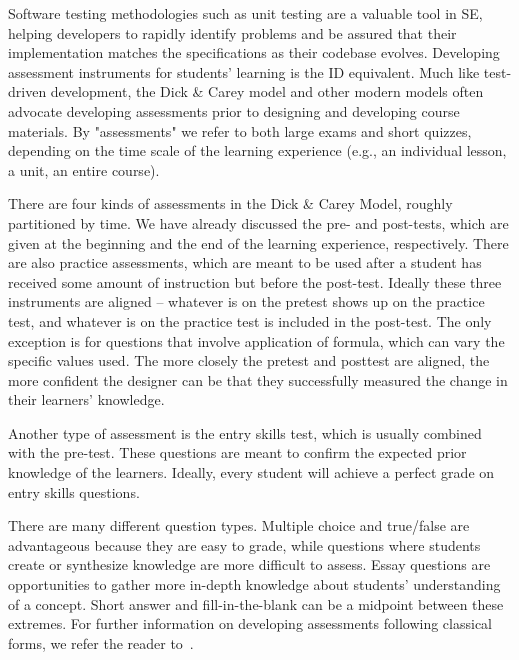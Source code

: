 
Software testing methodologies such as unit testing are a valuable tool in SE, helping developers to rapidly identify problems and be assured that their implementation matches the specifications as their codebase evolves.
Developing assessment instruments for students' learning is the ID equivalent.
Much like test-driven development, the Dick \& Carey model and other modern models often advocate developing assessments prior to designing and developing course materials.
By "assessments" we refer to both large exams and short quizzes, depending on the time scale of the learning experience (e.g., an individual lesson, a unit, an entire course).

There are four kinds of assessments in the Dick \& Carey Model, roughly partitioned by time.
We have already discussed the pre- and post-tests, which are given at the beginning and the end of the learning experience, respectively.
There are also practice assessments, which are meant to be used after a student has received some amount of instruction but before the post-test.
Ideally these three instruments are aligned -- whatever is on the pretest shows up on the practice test, and whatever is on the practice test is included in the post-test.
The only exception is for questions that involve application of formula, which can vary the specific values used.
The more closely the pretest and posttest are aligned, the more confident the designer can be that they successfully measured the change in their learners' knowledge.

Another type of assessment is the entry skills test, which is usually combined with the pre-test.
These questions are meant to confirm the expected prior knowledge of the learners.
Ideally, every student will achieve a perfect grade on entry skills questions.

There are many different question types.
Multiple choice and true/false are advantageous because they are easy to grade, while questions where students create or synthesize knowledge are more difficult to assess.
Essay questions are opportunities to gather more in-depth knowledge about students' understanding of a concept.
Short answer and fill-in-the-blank can be a midpoint between these extremes.
For further information on developing assessments following classical forms, we refer the reader to~\cite{nitko2001educational}.

